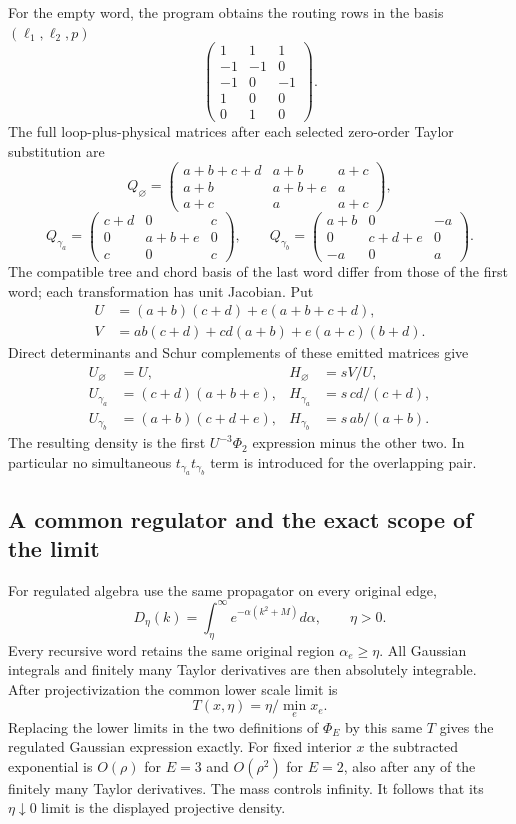 For the empty word, the program obtains the routing rows in the basis
$(\ell_1,\ell_2,p)$
\[
 \begin{pmatrix}1&1&1\\-1&-1&0\\-1&0&-1\\1&0&0\\0&1&0\end{pmatrix}.
\]
The full loop-plus-physical matrices after each selected zero-order
Taylor substitution are
\[
 Q_\varnothing=
 \begin{pmatrix}
 a+b+c+d&a+b&a+c\\
 a+b&a+b+e&a\\
 a+c&a&a+c
 \end{pmatrix},
\]
\[
 Q_{\gamma_a}=
 \begin{pmatrix}c+d&0&c\\0&a+b+e&0\\c&0&c\end{pmatrix},
 \qquad
 Q_{\gamma_b}=
 \begin{pmatrix}a+b&0&-a\\0&c+d+e&0\\-a&0&a\end{pmatrix}.
\]
The compatible tree and chord basis of the last word differ from those
of the first word; each transformation has unit Jacobian.  Put
\begin{align*}
 U&=(a+b)(c+d)+e(a+b+c+d),\\
 V&=ab(c+d)+cd(a+b)+e(a+c)(b+d).
\end{align*}
Direct determinants and Schur complements of these emitted matrices give
\begin{align*}
 U_\varnothing&=U,&H_\varnothing&=sV/U,\\
 U_{\gamma_a}&=(c+d)(a+b+e),&H_{\gamma_a}&=s\,cd/(c+d),\\
 U_{\gamma_b}&=(a+b)(c+d+e),&H_{\gamma_b}&=s\,ab/(a+b).
\end{align*}
The resulting density is the first $U^{-3}\Phi_2$ expression minus
the other two.  In particular no simultaneous
$t_{\gamma_a}t_{\gamma_b}$ term is introduced for the overlapping pair.

\subsection{A common regulator and the exact scope of the limit}

For regulated algebra use the same propagator on every original edge,
\[
 D_\eta(k)=\int_\eta^\infty e^{-\alpha(k^2+M)}d\alpha,
 \qquad \eta>0.
\]
Every recursive word retains the same original region
$\alpha_e\ge\eta$.  All Gaussian integrals and finitely many Taylor
derivatives are then absolutely integrable.  After projectivization the
common lower scale limit is
\[
 T(x,\eta)=\eta/\min_e x_e.
\]
Replacing the lower limits in the two definitions of $\Phi_E$ by this
same $T$ gives the regulated Gaussian expression exactly.  For fixed
interior $x$ the subtracted exponential is $O(\rho)$ for $E=3$ and
$O(\rho^2)$ for $E=2$, also after any of the finitely many Taylor
derivatives.  The mass controls infinity.  It follows that its
$\eta\downarrow0$ limit is the displayed projective density.

